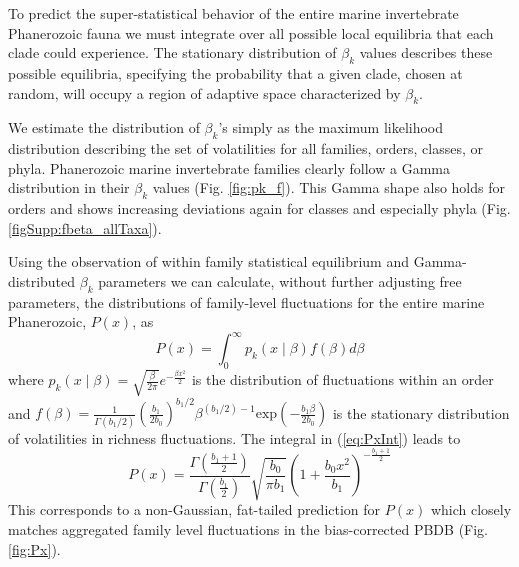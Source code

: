 \documentclass[12pt]{article}
\begin{document}
To predict the super-statistical behavior of the entire marine
invertebrate Phanerozoic fauna we must integrate over all possible
local equilibria that each clade could experience. The stationary
distribution of $\beta_k$ values describes these possible equilibria,
specifying the probability that a given clade, chosen at random, will
occupy a region of adaptive space characterized by $\beta_k$.

We estimate the distribution of $\beta_k$'s simply as the maximum
likelihood distribution describing the set of volatilities for all
families, orders, classes, or phyla. Phanerozoic marine invertebrate
families clearly follow a Gamma distribution in their $\beta_k$ values
(Fig. \ref{fig:pk_f}). This Gamma shape also holds for orders and
shows increasing deviations again for classes and especially phyla
(Fig. \ref{figSupp:fbeta_allTaxa}).

Using the observation of within family statistical equilibrium and
Gamma-distributed $\beta_k$ parameters we can calculate, without
further adjusting free parameters, the distributions of family-level
fluctuations for the entire marine Phanerozoic, $P(x)$, as
\begin{equation}
  P(x) = \int_0^\infty p_k(x \mid \beta) f(\beta) d\beta \label{eq:PxInt}
\end{equation}
where
$p_k(x \mid \beta) = \sqrt{\frac{\beta}{2\pi}} e^{-\frac{\beta
    x^2}{2}}$ is the distribution of fluctuations within an order and
$f(\beta) = \frac{1}{\Gamma(b_1/2)}
\left(\frac{b_1}{2b_0}\right)^{b_1/2} \beta^{(b_1/2) - 1}
\text{exp}\left(-\frac{b_1 \beta}{2 b_0}\right)$ is the stationary
distribution of volatilities in richness fluctuations. The integral in
(\ref{eq:PxInt}) leads to
\begin{equation}
  \label{eq:Px}
  P(x) = \frac{\Gamma\left(\frac{b_1 +
        1}{2}\right)}{\Gamma\left(\frac{b_1}{2}\right)}
  \sqrt{\frac{b_0}{\pi b_1}} \left(1 + \frac{b_0
      x^2}{b_1}\right)^{-\frac{b_1 + 1}{2}}
\end{equation}
This corresponds to a non-Gaussian, fat-tailed prediction for $P(x)$
which closely matches aggregated family level fluctuations in the
bias-corrected PBDB (Fig. \ref{fig:Px}).
\end{document}

